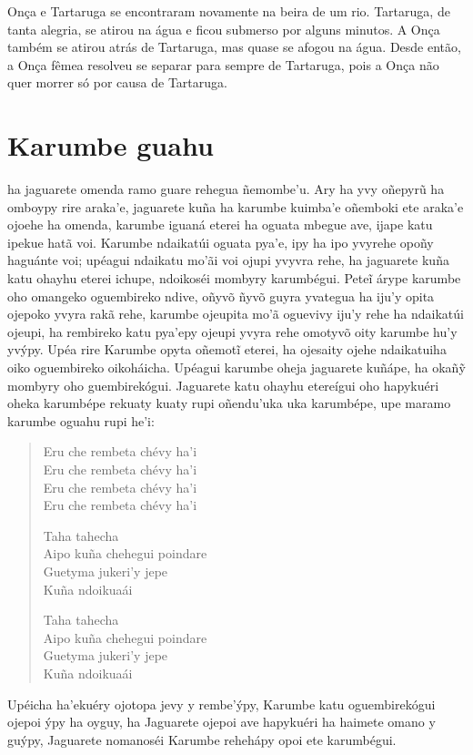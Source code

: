Onça e Tartaruga se encontraram novamente na beira de um rio. Tartaruga,
de tanta alegria, se atirou na água e ficou submerso por alguns minutos.
A Onça também se atirou atrás de Tartaruga, mas quase se afogou na água.
Desde então, a Onça fêmea resolveu se separar para sempre de Tartaruga,
pois a Onça não quer morrer só por causa de Tartaruga.

\chapter{Karumbe guahu}

 ha jaguarete omenda ramo guare rehegua ñemombe'u. Ary ha yvy
oñepyrũ ha omboypy rire araka'e, jaguarete kuña ha karumbe kuimba'e
oñemboki ete araka'e ojoehe ha omenda, karumbe iguaná eterei ha oguata
mbegue ave, ijape katu ipekue hatã voi. Karumbe ndaikatúi oguata pya'e,
ipy ha ipo yvyrehe opoñy haguánte voi; upéagui ndaikatu mo'ãi voi ojupi
yvyvra rehe, ha jaguarete kuña katu ohayhu eterei ichupe, ndoikoséi
mombyry karumbégui. Peteĩ árype karumbe oho omangeko oguembireko ndive,
oñyvõ ñyvõ guyra yvategua ha iju'y opita ojepoko yvyra rakã rehe,
karumbe ojeupita mo'ã oguevivy iju'y rehe ha ndaikatúi ojeupi, ha
rembireko katu pya'epy ojeupi yvyra rehe omotyvõ oity karumbe hu'y
yvýpy. Upéa rire Karumbe opyta oñemotĩ eterei, ha ojesaity ojehe
ndaikatuiha oiko oguembireko oikoháicha. Upéagui karumbe oheja jaguarete
kuñápe, ha okañỹ mombyry oho guembirekógui. Jaguarete katu ohayhu
etereígui oho hapykuéri oheka karumbépe rekuaty kuaty rupi oñendu'uka
uka karumbépe, upe maramo karumbe oguahu rupi he'i:

\begin{verse}
Eru che rembeta chévy ha'i\\
Eru che rembeta chévy ha'i\\
Eru che rembeta chévy ha'i\\
Eru che rembeta chévy ha'i

\pagebreak       
Taha tahecha\\
Aipo kuña chehegui poindare\\
Guetyma jukeri'y jepe\\
Kuña ndoikuaái
       
Taha tahecha\\
Aipo kuña chehegui poindare\\
Guetyma jukeri'y jepe\\
Kuña ndoikuaái
\end{verse}


Upéicha ha'ekuéry ojotopa jevy y rembe'ýpy, Karumbe katu oguembirekógui
ojepoi ýpy ha oyguy, ha Jaguarete ojepoi ave hapykuéri ha haimete omano
y guýpy, Jaguarete nomanoséi Karumbe rehehápy opoi ete karumbégui.


